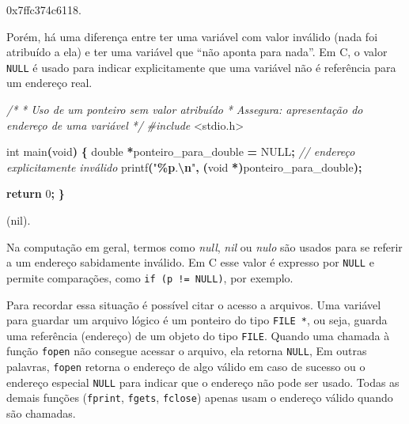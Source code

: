 \documentclass[
  11pt,
  a4paper,
]{scrbook}
\newenvironment{Shaded}{\begin{snugshade}}{\end{snugshade}}
\newcommand{\CommentTok}[1]{\textcolor[rgb]{0.56,0.35,0.01}{\textit{#1}}}
\newcommand{\ControlFlowTok}[1]{\textcolor[rgb]{0.13,0.29,0.53}{\textbf{#1}}}
\newcommand{\DataTypeTok}[1]{\textcolor[rgb]{0.13,0.29,0.53}{#1}}
\newcommand{\DecValTok}[1]{\textcolor[rgb]{0.00,0.00,0.81}{#1}}
\newcommand{\ImportTok}[1]{#1}
\newcommand{\NormalTok}[1]{#1}
\newcommand{\OperatorTok}[1]{\textcolor[rgb]{0.81,0.36,0.00}{\textbf{#1}}}
\newcommand{\PreprocessorTok}[1]{\textcolor[rgb]{0.56,0.35,0.01}{\textit{#1}}}
\newcommand{\SpecialCharTok}[1]{\textcolor[rgb]{0.81,0.36,0.00}{\textbf{#1}}}
\newcommand{\StringTok}[1]{\textcolor[rgb]{0.31,0.60,0.02}{#1}}
\begin{document}
\begin{Shaded}
\begin{Highlighting}[]
\NormalTok{0x7ffc374c6118.}
\end{Highlighting}
\end{Shaded}

Porém, há uma diferença entre ter uma variável com valor inválido (nada
foi atribuído a ela) e ter uma variável que ``não aponta para nada''. Em
C, o valor \texttt{NULL} é usado para indicar explicitamente que uma
variável não é referência para um endereço real.

\begin{Shaded}
\begin{Highlighting}[]
\CommentTok{/*}
\CommentTok{ * Uso de um ponteiro sem valor atribuído}
\CommentTok{ * Assegura: apresentação do endereço de uma variável}
\CommentTok{ */}
\PreprocessorTok{\#include }\ImportTok{\textless{}stdio.h\textgreater{}}

\DataTypeTok{int}\NormalTok{ main}\OperatorTok{(}\DataTypeTok{void}\OperatorTok{)} \OperatorTok{\{}
    \DataTypeTok{double} \OperatorTok{*}\NormalTok{ponteiro\_para\_double }\OperatorTok{=}\NormalTok{ NULL}\OperatorTok{;}  \CommentTok{// endereço explicitamente inválido}
\NormalTok{    printf}\OperatorTok{(}\StringTok{"}\SpecialCharTok{\%p}\StringTok{.}\SpecialCharTok{\textbackslash{}n}\StringTok{"}\OperatorTok{,} \OperatorTok{(}\DataTypeTok{void} \OperatorTok{*)}\NormalTok{ponteiro\_para\_double}\OperatorTok{);} 

    \ControlFlowTok{return} \DecValTok{0}\OperatorTok{;}
\OperatorTok{\}}
\end{Highlighting}
\end{Shaded}

\begin{Shaded}
\begin{Highlighting}[]
\NormalTok{(nil).}
\end{Highlighting}
\end{Shaded}

Na computação em geral, termos como \emph{null}, \emph{nil} ou
\emph{nulo} são usados para se referir a um endereço sabidamente
inválido. Em C esse valor é expresso por \texttt{NULL} e permite
comparações, como \texttt{if\ (p\ !=\ NULL)}, por exemplo.

Para recordar essa situação é possível citar o acesso a arquivos. Uma
variável para guardar um arquivo lógico é um ponteiro do tipo
\texttt{FILE\ *}, ou seja, guarda uma referência (endereço) de um objeto
do tipo \texttt{FILE}. Quando uma chamada à função \texttt{fopen} não
consegue acessar o arquivo, ela retorna \texttt{NULL}, Em outras
palavras, \texttt{fopen} retorna o endereço de algo válido em caso de
sucesso ou o endereço especial \texttt{NULL} para indicar que o endereço
não pode ser usado. Todas as demais funções (\texttt{fprint},
\texttt{fgets}, \texttt{fclose}) apenas usam o endereço válido quando
são chamadas.
\end{document}

